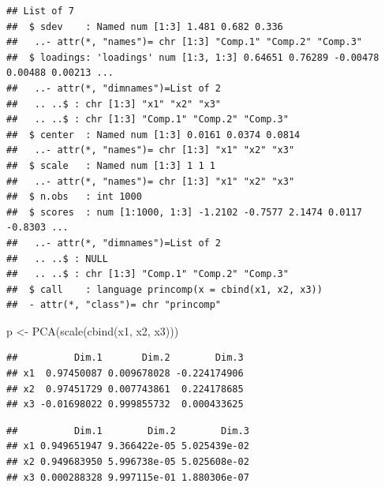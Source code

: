 \documentclass[
  12pt,
]{book}
\newenvironment{Shaded}{\begin{snugshade}}{\end{snugshade}}
\newcommand{\FunctionTok}[1]{\textcolor[rgb]{0.00,0.00,0.00}{#1}}
\newcommand{\NormalTok}[1]{#1}
\newcommand{\OtherTok}[1]{\textcolor[rgb]{0.56,0.35,0.01}{#1}}
\newcommand{\SpecialCharTok}[1]{\textcolor[rgb]{0.00,0.00,0.00}{#1}}
\theoremstyle{definition}
\theoremstyle{definition}
\theoremstyle{definition}
\theoremstyle{definition}
\theoremstyle{remark}
\begin{document}
\begin{verbatim}
## List of 7
##  $ sdev    : Named num [1:3] 1.481 0.682 0.336
##   ..- attr(*, "names")= chr [1:3] "Comp.1" "Comp.2" "Comp.3"
##  $ loadings: 'loadings' num [1:3, 1:3] 0.64651 0.76289 -0.00478 0.00488 0.00213 ...
##   ..- attr(*, "dimnames")=List of 2
##   .. ..$ : chr [1:3] "x1" "x2" "x3"
##   .. ..$ : chr [1:3] "Comp.1" "Comp.2" "Comp.3"
##  $ center  : Named num [1:3] 0.0161 0.0374 0.0814
##   ..- attr(*, "names")= chr [1:3] "x1" "x2" "x3"
##  $ scale   : Named num [1:3] 1 1 1
##   ..- attr(*, "names")= chr [1:3] "x1" "x2" "x3"
##  $ n.obs   : int 1000
##  $ scores  : num [1:1000, 1:3] -1.2102 -0.7577 2.1474 0.0117 -0.8303 ...
##   ..- attr(*, "dimnames")=List of 2
##   .. ..$ : NULL
##   .. ..$ : chr [1:3] "Comp.1" "Comp.2" "Comp.3"
##  $ call    : language princomp(x = cbind(x1, x2, x3))
##  - attr(*, "class")= chr "princomp"
\end{verbatim}

\begin{Shaded}
\begin{Highlighting}[]
\NormalTok{p }\OtherTok{\textless{}{-}} \FunctionTok{PCA}\NormalTok{(}\FunctionTok{scale}\NormalTok{(}\FunctionTok{cbind}\NormalTok{(x1, x2, x3)))}
\end{Highlighting}
\end{Shaded}

\begin{Shaded}
\end{Shaded}

\begin{verbatim}
##          Dim.1       Dim.2        Dim.3
## x1  0.97450087 0.009678028 -0.224174906
## x2  0.97451729 0.007743861  0.224178685
## x3 -0.01698022 0.999855732  0.000433625
\end{verbatim}

\begin{Shaded}
\end{Shaded}

\begin{verbatim}
##          Dim.1        Dim.2        Dim.3
## x1 0.949651947 9.366422e-05 5.025439e-02
## x2 0.949683950 5.996738e-05 5.025608e-02
## x3 0.000288328 9.997115e-01 1.880306e-07
\end{verbatim}
\end{document}
